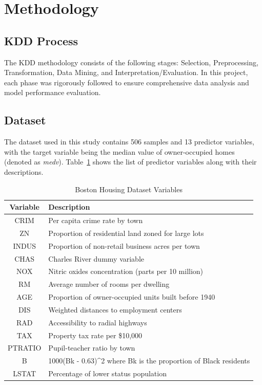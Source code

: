 \documentclass[12pt]{article}
\begin{document}
\section{Methodology}

\subsection{KDD Process}
The KDD methodology consists of the following stages: Selection, Preprocessing, Transformation, Data Mining, and Interpretation/Evaluation. In this project, each phase was rigorously followed to ensure comprehensive data analysis and model performance evaluation.

\subsection{Dataset}
The dataset used in this study contains 506 samples and 13 predictor variables, with the target variable being the median value of owner-occupied homes (denoted as \textit{medv}). Table~\ref{table:dataset} shows the list of predictor variables along with their descriptions.

\begin{table}[H]
\centering
\begin{tabular}{|c|l|}
\hline
\textbf{Variable} & \textbf{Description} \\ \hline
CRIM              & Per capita crime rate by town      \\ \hline
ZN                & Proportion of residential land zoned for large lots       \\ \hline
INDUS             & Proportion of non-retail business acres per town          \\ \hline
CHAS              & Charles River dummy variable       \\ \hline
NOX               & Nitric oxides concentration (parts per 10 million)        \\ \hline
RM                & Average number of rooms per dwelling      \\ \hline
AGE               & Proportion of owner-occupied units built before 1940       \\ \hline
DIS               & Weighted distances to employment centers       \\ \hline
RAD               & Accessibility to radial highways        \\ \hline
TAX               & Property tax rate per \$10,000     \\ \hline
PTRATIO           & Pupil-teacher ratio by town     \\ \hline
B                 & 1000(Bk - 0.63)\textasciicircum{}2 where Bk is the proportion of Black residents \\ \hline
LSTAT             & Percentage of lower status population \\ \hline
\end{tabular}
\caption{Boston Housing Dataset Variables}
\label{table:dataset}
\end{table}
\end{document}
